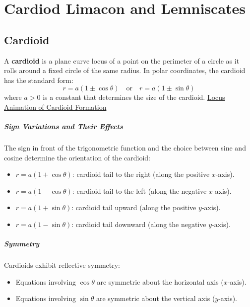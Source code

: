 \chapter{Cardiod Limacon and Lemniscates}
\label{chap:cardiod-limacon-and-lemniscates}

\section{Cardioid}
\label{sec:cardiod}

\begin{definition}[Cardioid]
  \label{def:cardiod}
  A \textbf{cardioid} is a plane curve locus of a point on the perimeter of a circle as it rolls around a fixed circle of the same radius. In polar coordinates, the cardioid has the standard form:
  \[
    r = a(1 \pm \cos\theta) \quad \text{or} \quad r = a(1 \pm \sin\theta)
  \]
  where $a > 0$ is a constant that determines the size of the cardioid.
  \href{https://youtu.be/SQdcqX94MWc?si=aSOYx60hIVEaqeGL}{Locus Animation of
  Cardioid Formation}
\end{definition}

\paragraph{Sign Variations and Their Effects}
The sign in front of the trigonometric function and the choice between sine and cosine determine the orientation of the cardioid:
\begin{itemize}
  \item $r = a(1 + \cos\theta)$: cardioid tail to the right (along the positive $x$-axis).
  \item $r = a(1 - \cos\theta)$: cardioid tail to the left (along the negative $x$-axis).
  \item $r = a(1 + \sin\theta)$: cardioid tail upward (along the positive $y$-axis).
  \item $r = a(1 - \sin\theta)$: cardioid tail downward (along the negative $y$-axis).
\end{itemize}

\paragraph{Symmetry}
Cardioids exhibit reflective symmetry:
\begin{itemize}
  \item Equations involving \(\cos\theta\) are symmetric about the horizontal axis ($x$-axis).
  \item Equations involving \(\sin\theta\) are symmetric about the vertical axis ($y$-axis).
\end{itemize}

